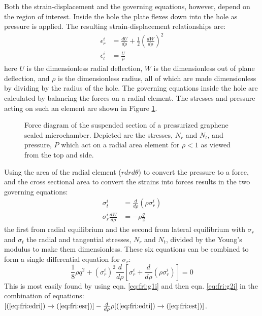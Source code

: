 Both the strain-displacement and the governing equations, however, depend on the region of interest.
Inside the hole the plate flexes down into the hole as pressure is applied.
The resulting strain-displacement relationships are:
\begin{align}
	\epsilon_r^i&=\frac{dU}{d\rho}+\frac{1}{2} (\frac{dW}{d\rho})^2 \label{eq:fri:edri}\\
	\epsilon_t^i&=\frac{U}{\rho} \label{eq:fri:edti}
\end{align}
here $U$ is the dimensionless radial deflection, $W$ is the dimensionless out of plane deflection, and $\rho$ is the dimensionless radius, all of which are made dimensionless by dividing by the radius of the hole.
The governing equations inside the hole are calculated by balancing the forces on a radial element.
The stresses and pressure acting on such an element are shown in Figure \ref{fig:fri:stressfigurei}.
\begin{figure}
	\begin{center}
	
	\end{center}
	\caption[Force diagram of the suspended section of a pressurized graphene sealed microchamber]{\label{fig:fri:stressfigurei} Force diagram of the suspended section of a pressurized graphene sealed microchamber. Depicted are the stresses, $N_r$ and $N_t$, and pressure, $P$ which act on a radial area element for $\rho<1$ as viewed from the top and side.}
\end{figure}
Using the area of the radial element ($r dr d\theta$) to convert the pressure to a force, and the cross sectional area to convert the strains into forces results in the two governing equations:
\begin{align}
	\sigma_t^i&=\frac{d}{d \rho}(\rho \sigma_r^i) \label{eq:fri:g1i}\\
	\sigma_r^i \frac{dW}{d \rho}&=-\rho \frac{q}{2} \label{eq:fri:g2i}
\end{align}
the first from radial equilibrium and the second from lateral equilibrium with $\sigma_r$ and $\sigma_t$ the radial and tangential stresses, $N_r$ and $N_t$, divided by the Young's modulus to make them dimensionless.
These six equations can be combined to form a single differential equation for $\sigma_r$:
\begin{equation}
	\frac{1}{8} \rho q^2+ (\sigma_r^i)^2 \frac{d}{d\rho}[\sigma_r^i+\frac{d}{d\rho}(\rho \sigma_r^i)]=0
	\label{eq:fri:comboin}
\end{equation}
This is most easily found by using eqn. \ref{eq:fri:g1i} and then eqn. \ref{eq:fri:g2i} in the combination of equations: $[(\ref{eq:fri:edri}) \rightarrow (\ref{eq:fri:esr})]-\frac{d}{d \rho}\rho[(\ref{eq:fri:edti})\rightarrow(\ref{eq:fri:est})]$.
